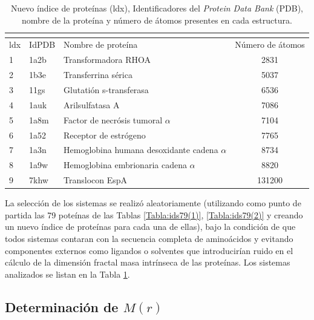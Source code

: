  	\begin{table}[H]
 		\centering
 		\begin{tabular}{||lllc||}
 			\multicolumn{4}{l}{} \\ 
 			\hline
 			ldx & IdPDB & Nombre de prote\'{i}na & N\'{u}mero de \'{a}tomos \\
 			\hline
 			 1  & 1a2b & Transformadora RHOA & 2831 \\
 			 2 & 1b3e & Transferrina s\'{e}rica & 5037 \\
 			 3 & 11gs & Glutati\'{o}n s-transferasa & 6536 \\ 
 			 4 & 1auk & Arilsulfatasa A & 7086 \\
 			 5 & 1a8m & Factor de necr\'{o}sis tumoral $\alpha$ & 7104 \\
 			 6 & 1a52 & Receptor de estr\'{o}geno & 7765 \\
 			 7 & 1a3n & Hemoglobina humana desoxidante cadena $\alpha$ & 8734 \\
 			 8 & 1a9w & Hemoglobina embrionaria cadena $\alpha$ & 8820 \\
 			 9 & 7khw & Translocon EspA & 131200 \\
 			\hline
 		\end{tabular}
 		\caption{Nuevo \'{i}ndice de prote\'{i}nas (ldx), Identificadores del \emph{Protein Data Bank} (PDB), nombre de la prote\'{i}na y n\'{u}mero de \'{a}tomos presentes en cada estructura.}
 		\label{Tabla:ids9}
 	\end{table}
 	
 	
 	
 	La selecci\'{o}n de los sistemas se realiz\'{o} aleatoriamente (utilizando como punto de partida las 79 pote\'{i}nas de las Tablas \ref{Tabla:ids79(1)}, \ref{Tabla:ids79(2)} y creando un nuevo \'{i}ndice de prote\'{i}nas para cada una de ellas), bajo la condici\'{o}n de que todos sistemas contaran con la secuencia completa de amino\'{a}cidos y evitando componentes externos como ligandos o solventes que introducir\'{i}an ruido en el c\'{a}lculo de la dimensi\'{o}n fractal masa intr\'{i}nseca de las prote\'{i}nas. Los sistemas analizados se listan en la Tabla \ref{Tabla:ids9}.
 

	
	\subsection{Determinaci\'{o}n de $M(r)$}
	\label{sec:detM(r)}
	
